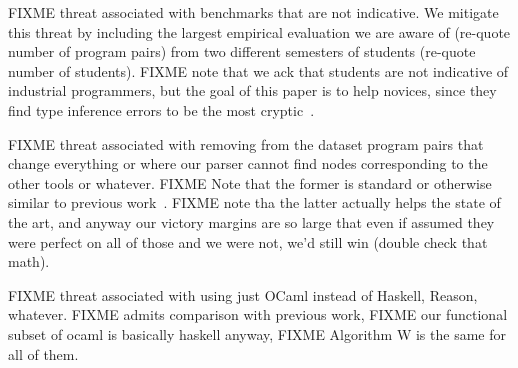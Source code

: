 FIXME threat associated with benchmarks that are not indicative. We
mitigate this threat by including the largest empirical evaluation we are
aware of (re-quote number of program pairs) from two different semesters of
students (re-quote number of students). FIXME note that we ack that
students are not indicative of industrial programmers, but the goal of this
paper is to help novices, since they find type inference errors to be the
most cryptic~\cite{FIXME}. 

FIXME threat associated with removing from the dataset program pairs
that change everything or where our parser cannot find nodes corresponding
to the other tools or whatever. FIXME Note that the former is
standard or otherwise similar to previous work~\cite{FIXME}. FIXME note tha
the latter actually helps the state of the art, and anyway our victory
margins are so large that even if assumed they were perfect on all of those
and we were not, we'd still win (double check that math). 

FIXME threat associated with using just OCaml instead of Haskell, Reason,
whatever. FIXME admits comparison with previous work, FIXME our functional
subset of ocaml is basically haskell anyway, FIXME Algorithm W is the same
for all of them.



